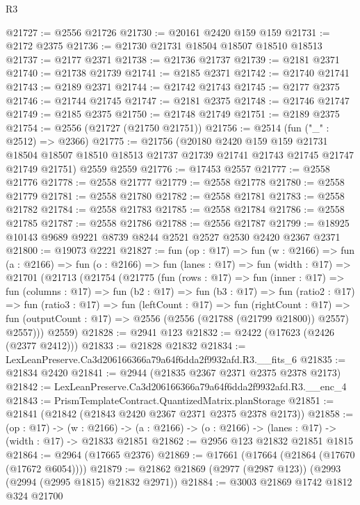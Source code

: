 \begin{lexlean}{R3}
\begin{coremodule}
@21727 := @2556 @21726
@21730 := @20161 @2420 @159 @159
@21731 := @2172 @2375
@21736 := @21730 @21731 @18504 @18507 @18510 @18513
@21737 := @2177 @2371
@21738 := @21736 @21737
@21739 := @2181 @2371
@21740 := @21738 @21739
@21741 := @2185 @2371
@21742 := @21740 @21741
@21743 := @2189 @2371
@21744 := @21742 @21743
@21745 := @2177 @2375
@21746 := @21744 @21745
@21747 := @2181 @2375
@21748 := @21746 @21747
@21749 := @2185 @2375
@21750 := @21748 @21749
@21751 := @2189 @2375
@21754 := @2556 (@21727 (@21750 @21751))
@21756 := @2514 (fun ("_" : @2512) => @2366)
@21775 := @21756
    (@20180
      @2420
      @159
      @159
      @21731
      @18504
      @18507
      @18510
      @18513
      @21737
      @21739
      @21741
      @21743
      @21745
      @21747
      @21749
      @21751)
    @2559
    @2559
@21776 := @17453 @2557
@21777 := @2558 @21776
@21778 := @2558 @21777
@21779 := @2558 @21778
@21780 := @2558 @21779
@21781 := @2558 @21780
@21782 := @2558 @21781
@21783 := @2558 @21782
@21784 := @2558 @21783
@21785 := @2558 @21784
@21786 := @2558 @21785
@21787 := @2558 @21786
@21788 := @2556 @21787
@21799 := @18925 @10143 @9689 @9221 @8739 @8244 @2521 @2527 @2530 @2420 @2367 @2371
@21800 := @19073 @2221
@21827 := fun (op : @17) =>
  fun (w : @2166) =>
  fun (a : @2166) =>
  fun (o : @2166) =>
  fun (lanes : @17) =>
  fun (width : @17) =>
  @21701
    (@21713
      (@21754
        (@21775
          (fun (rows : @17) =>
          fun (inner : @17) =>
          fun (columns : @17) =>
          fun (b2 : @17) =>
          fun (b3 : @17) =>
          fun (ratio2 : @17) =>
          fun (ratio3 : @17) =>
          fun (leftCount : @17) =>
          fun (rightCount : @17) =>
          fun (outputCount : @17) => @2556 (@2556 (@21788 (@21799 @21800)) @2557) @2557)))
      @2559)
@21828 := @2941 @123
@21832 := @2422 (@17623 (@2426 (@2377 @2412)))
@21833 := @21828 @21832
@21834 := LexLeanPreserve.Ca3d206166366a79a64f6dda2f9932afd.R3.__fits_6
@21835 := @21834 @2420
@21841 := @2944 (@21835 @2367 @2371 @2375 @2378 @2173)
@21842 := LexLeanPreserve.Ca3d206166366a79a64f6dda2f9932afd.R3.__enc_4
@21843 := PrismTemplateContract.QuantizedMatrix.planStorage
@21851 := @21841 (@21842 (@21843 @2420 @2367 @2371 @2375 @2378 @2173))
@21858 := (op : @17) ->
  (w : @2166) -> (a : @2166) -> (o : @2166) -> (lanes : @17) -> (width : @17) -> @21833 @21851
@21862 := @2956 @123 @21832 @21851 @1815
@21864 := @2964 (@17665 @2376)
@21869 := @17661 (@17664 (@21864 (@17670 (@17672 @6054))))
@21879 := @21862 @21869 (@2977 (@2987 @123)) (@2993 (@2994 (@2995 @1815) @21832 @2971))
@21884 := @3003 @21869 @1742 @1812 @324 @21700

\end{coremodule}
\end{lexlean}

